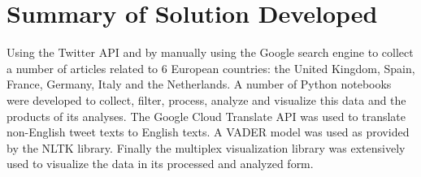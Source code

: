 %
%

\section{Summary of Solution Developed}
Using the Twitter \ac{API}\citep{roesslein2020tweepy} and by manually using the Google search engine to collect a number of articles related to 6 European countries: the United Kingdom, Spain, France, Germany, Italy and the Netherlands.
A number of Python notebooks were developed to collect, filter, process, analyze and visualize this data and the products of its analyses.
The Google Cloud Translate \ac{API} was used to translate non-English tweet texts to English texts.
A \ac{VADER} model was used as provided by the \ac{NLTK} library\citep{bird2009natural}.
Finally the multiplex visualization library\citep{Mamo2021} was extensively used to visualize the data in its processed and analyzed form.

%
%


%
%

